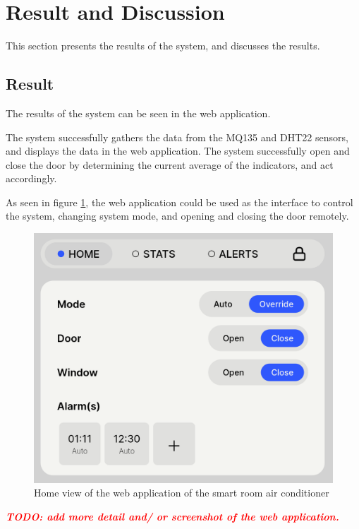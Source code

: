 \section{Result and Discussion}
This section presents the results of the system,
and discusses the results.

\subsection{Result}
The results of the system can be seen in the web
application.

The system successfully gathers the data from the
MQ135 and DHT22 sensors, and displays the data in
the web application.
The system successfully open and close the door by
determining the current average of the indicators,
and act accordingly.

As seen in figure \ref{webapp-home-view}, the web application
could be used as the interface to control the system,
changing system mode, and opening and closing the door
remotely.

\begin{figure}
      \centerline{\includegraphics[scale=0.2]{resources/webapp-home-view.png}}
      \caption{Home view of the web application of the smart room air conditioner}
      \label{webapp-home-view}
\end{figure}

\textcolor{red}{
      \textbf{
            \emph{TODO: add more detail and/
                  or screenshot of the web application.}
      }
}

